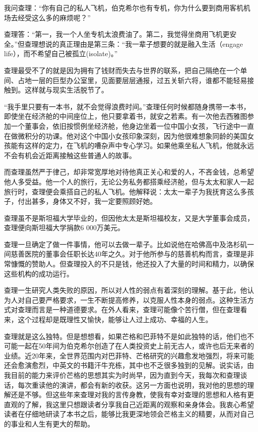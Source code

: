 我问查理：“你有自己的私人飞机，伯克希尔也有专机，你为什么要到商用客机机场去经受这么多的麻烦呢？”
\par

查理答：“第一，我一个人坐专机太浪费油了。第二，我觉得坐商用飞机更安全。”但查理想说的真正理由是第三条：“我一辈子想要的就是融入生活（engage life），而不希望自己被孤立(isolate)。”
\par

查理最受不了的就是因为拥有了钱财而失去与世界的联系，把自己隔绝在一个单间、占地一层的巨型办公室里，见面要层层通报，过五关斩六将，谁都不能轻易接触到。这样就与现实生活脱节了。
\par

“我手里只要有一本书，就不会觉得浪费时间。”查理任何时候都随身携带一本书，即使坐在经济舱的中间座位上，他只要拿着书，就安之若素。有一次他去西雅图参加一个董事会，依旧按惯例坐经济舱，他身边坐着一位中国小女孩，飞行途中一直在做微积分的功课。他对这个中国小女孩印象深刻，因为他很难想象同龄的美国女孩能有这样的定力，在飞机的嘈杂声中专心学习。如果他乘坐私人飞机，他就永远不会有机会近距离接触这些普通人的故事。
\par

而查理虽然严于律己，却非常宽厚地对待他真正关心和爱的人，不吝金钱，总希望他人多受益。他一个人的旅行，无论公务私务都搭乘经济舱，但与太太和家人一起旅行时，查理便会乘搭自己的私人飞机。他解释说：太太一辈子为我抚育这么多孩子，付出甚多，身体又不好，我一定要照顾好她。
\par

查理虽不是斯坦福大学毕业的，但因他太太是斯坦福校友，又是大学董事会成员，查理便向斯坦福大学捐款6 000万美元。
\par

查理一旦确定了做一件事情，他可以去做一辈子。比如说他在哈佛高中及洛杉矶一间慈善医院的董事会任职长达40年之久。对于他所参与的慈善机构而言，查理是非常慷慨的赞助人。但查理投入的不只是钱，他还投入了大量的时间和精力，以确保这些机构的成功运行。
\par

查理一生研究人类失败的原因，所以对人性的弱点有着深刻的理解。基于此，他认为人对自己要严格要求，一生不断提高修养，以克服人性本身的弱点。这种生活方式对查理而言是一种道德要求。在外人看来，查理可能像个苦行僧，但在查理看来，这个过程却是既理性又愉快，能够让人过上成功、幸福的人生。
\par

查理就是这么独特。但是想想看，如果芒格和巴菲特不是如此独特的话，他们也不可能一起在50年间为伯克希尔创造了在人类投资史上前无古人，或许也后无来者的业绩。近20年来，全世界范围内对巴菲特、芒格研究的兴趣愈发地强烈，将来可能还会愈演愈烈，中英文的书籍汗牛充栋，其中也不乏很多独到的见解。说实话，由我目前的能力来评价芒格的思想其实为时尚早，因为直到今天，我每次和查理谈话，每次重读他的演讲，都会有新的收获。这另一方面也说明，我对他的思想的理解还是不够。但这些年来查理对我的言传身教，使我有幸对查理的思想和人格有更直观的了解，我这里只想跟读者分享我自己近距离的观察和亲身体会。我衷心希望读者在仔细地研读了本书之后，能够比我更深地领会芒格主义的精要，从而对自己的事业和人生有更大的帮助。
\par

